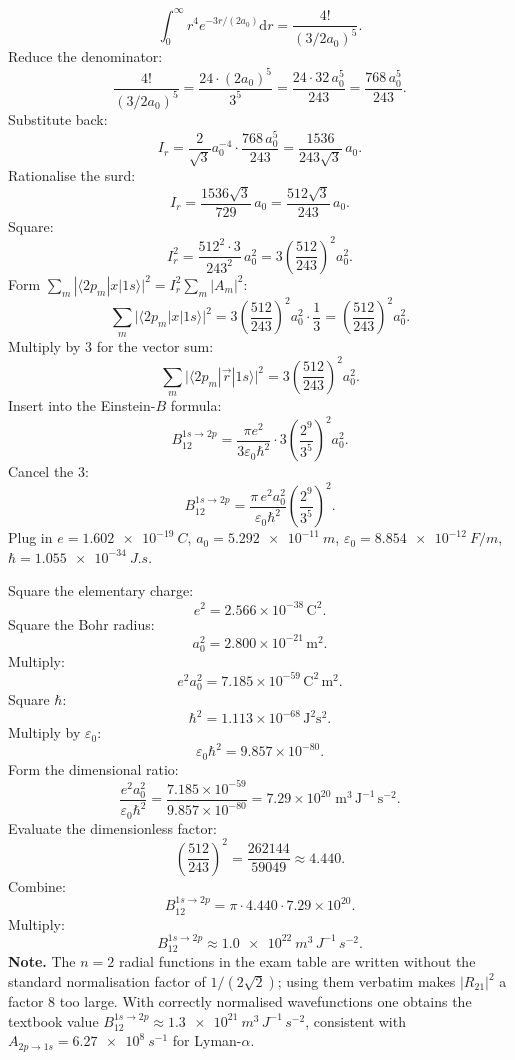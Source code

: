 \documentclass[11pt]{article}
\newcommand{\de}{\mathrm{d}}
\begin{document}
\[
\int_0^\infty r^4 e^{-3r/(2a_0)}\de r=\frac{4!}{(3/2a_0)^5}.
\]
Reduce the denominator:
\[
\frac{4!}{(3/2a_0)^5}=\frac{24\cdot(2a_0)^5}{3^5}=\frac{24\cdot 32\,a_0^5}{243}=\frac{768\,a_0^5}{243}.
\]
Substitute back:
\[
I_r=\frac{2}{\sqrt{3}}a_0^{-4}\cdot\frac{768\,a_0^5}{243}=\frac{1536}{243\sqrt{3}}\,a_0.
\]
Rationalise the surd:
\[
I_r=\frac{1536\sqrt{3}}{729}\,a_0=\frac{512\sqrt{3}}{243}\,a_0.
\]
Square:
\[
I_r^2=\frac{512^2\cdot 3}{243^2}\,a_0^2=3\!\left(\frac{512}{243}\right)^{\!2}a_0^2.
\]
Form $\sum_m|\langle 2p_m|x|1s\rangle|^2=I_r^2\sum_m|A_m|^2$:
\[
\sum_m\bigl|\langle 2p_m|x|1s\rangle\bigr|^2=3\!\left(\frac{512}{243}\right)^{\!2}a_0^2\cdot\frac{1}{3}=\left(\frac{512}{243}\right)^{\!2}a_0^2.
\]
Multiply by 3 for the vector sum:
\[
\sum_m\bigl|\langle 2p_m|\vec r|1s\rangle\bigr|^2=3\!\left(\frac{512}{243}\right)^{\!2}a_0^2.
\]
Insert into the Einstein-$B$ formula:
\[
B_{12}^{1s\to 2p}=\frac{\pi e^2}{3\varepsilon_0\hbar^2}\cdot 3\!\left(\frac{2^9}{3^5}\right)^{\!2}\!a_0^2.
\]
Cancel the 3:
\[
B_{12}^{1s\to 2p}=\frac{\pi\,e^2 a_0^2}{\varepsilon_0\hbar^2}\!\left(\frac{2^9}{3^5}\right)^{\!2}.
\]
Plug in $e=\SI{1.602e-19}{C}$, $a_0=\SI{5.292e-11}{m}$, $\varepsilon_0=\SI{8.854e-12}{F/m}$, $\hbar=\SI{1.055e-34}{J.s}$.

Square the elementary charge:
\[
e^2=2.566\times 10^{-38}\,\text{C}^2.
\]
Square the Bohr radius:
\[
a_0^2=2.800\times 10^{-21}\,\text{m}^2.
\]
Multiply:
\[
e^2 a_0^2=7.185\times 10^{-59}\,\text{C}^2\,\text{m}^2.
\]
Square $\hbar$:
\[
\hbar^2=1.113\times 10^{-68}\,\text{J}^2\text{s}^2.
\]
Multiply by $\varepsilon_0$:
\[
\varepsilon_0\hbar^2=9.857\times 10^{-80}.
\]
Form the dimensional ratio:
\[
\frac{e^2 a_0^2}{\varepsilon_0\hbar^2}=\frac{7.185\times 10^{-59}}{9.857\times 10^{-80}}=7.29\times 10^{20}\;\text{m}^3\,\text{J}^{-1}\,\text{s}^{-2}.
\]
Evaluate the dimensionless factor:
\[
\left(\frac{512}{243}\right)^{\!2}=\frac{262144}{59049}\approx 4.440.
\]
Combine:
\[
B_{12}^{1s\to 2p}=\pi\cdot 4.440\cdot 7.29\times 10^{20}.
\]
Multiply:
\[
\boxed{\;B_{12}^{1s\to 2p}\approx\SI{1.0e22}{m^3\,J^{-1}\,s^{-2}}.\;}
\]
\textbf{Note.} The $n=2$ radial functions in the exam table are written without the standard normalisation factor of $1/(2\sqrt{2})$; using them verbatim makes $|R_{21}|^2$ a factor 8 too large. With correctly normalised wavefunctions one obtains the textbook value $B_{12}^{1s\to 2p}\approx\SI{1.3e21}{m^3\,J^{-1}\,s^{-2}}$, consistent with $A_{2p\to 1s}=\SI{6.27e8}{s^{-1}}$ for Lyman-$\alpha$.
\end{document}
